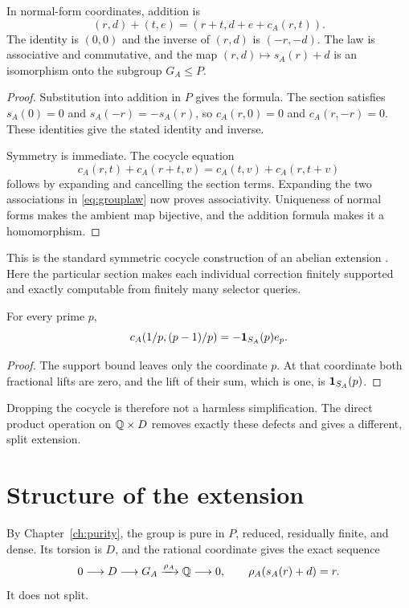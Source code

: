 \begin{theorem}
\label{thm:cocyclelaw}
In normal-form coordinates, addition is
\begin{equation}
\label{eq:grouplaw}
(r,d)+(t,e)=(r+t,d+e+c_A(r,t)).
\end{equation}
The identity is $(0,0)$ and the inverse of $(r,d)$ is $(-r,-d)$. The law is associative and commutative, and the map $(r,d)\mapsto s_A(r)+d$ is an isomorphism onto the subgroup $G_A\le P$.
\end{theorem}
\begin{proof}
Substitution into addition in $P$ gives the formula. The section satisfies $s_A(0)=0$ and $s_A(-r)=-s_A(r)$, so $c_A(r,0)=0$ and $c_A(r,-r)=0$. These identities give the stated identity and inverse.

Symmetry is immediate. The cocycle equation
\[
c_A(r,t)+c_A(r+t,v)=c_A(t,v)+c_A(r,t+v)
\]
follows by expanding and cancelling the section terms. Expanding the two associations in \eqref{eq:grouplaw} now proves associativity. Uniqueness of normal forms makes the ambient map bijective, and the addition formula makes it a homomorphism.
\end{proof}
This is the standard symmetric cocycle construction of an abelian extension \cite[Section 3.2]{Lupini}. Here the particular section makes each individual correction finitely supported and exactly computable from finitely many selector queries.

\begin{proposition}
\label{thm:cocyclebit}
For every prime $p$,
\[
c_A(1/p,(p-1)/p)=-\mathbf 1_{S_A}(p)e_p.
\]
\end{proposition}
\begin{proof}
The support bound leaves only the coordinate $p$. At that coordinate both fractional lifts are zero, and the lift of their sum, which is one, is $\mathbf 1_{S_A}(p)$.
\end{proof}
Dropping the cocycle is therefore not a harmless simplification. The direct product operation on $\mathbb Q\times D$ removes exactly these defects and gives a different, split extension.

\section{Structure of the extension}
By Chapter~\ref{ch:purity}, the group is pure in $P$, reduced, residually finite, and dense. Its torsion is $D$, and the rational coordinate gives the exact sequence
\begin{equation}
\label{eq:extension}
0\longrightarrow D\longrightarrow G_A\xrightarrow{\rho_A}\mathbb Q\longrightarrow0,
\qquad \rho_A(s_A(r)+d)=r.
\end{equation}
It does not split.

